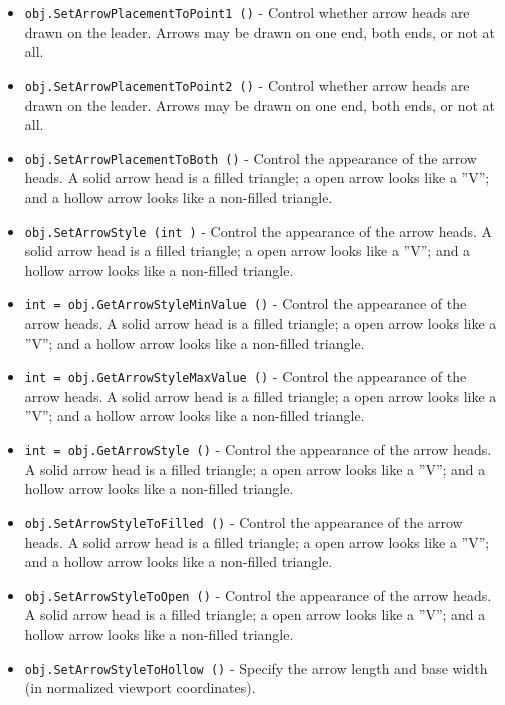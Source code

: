\begin{itemize}
\item  \verb|obj.SetArrowPlacementToPoint1 ()| -  Control whether arrow heads are drawn on the leader. Arrows may be
 drawn on one end, both ends, or not at all.

\item  \verb|obj.SetArrowPlacementToPoint2 ()| -  Control whether arrow heads are drawn on the leader. Arrows may be
 drawn on one end, both ends, or not at all.

\item  \verb|obj.SetArrowPlacementToBoth ()| -  Control the appearance of the arrow heads. A solid arrow head is a filled
 triangle; a open arrow looks like a ''V''; and a hollow arrow looks like a
 non-filled triangle.

\item  \verb|obj.SetArrowStyle (int )| -  Control the appearance of the arrow heads. A solid arrow head is a filled
 triangle; a open arrow looks like a ''V''; and a hollow arrow looks like a
 non-filled triangle.

\item  \verb|int = obj.GetArrowStyleMinValue ()| -  Control the appearance of the arrow heads. A solid arrow head is a filled
 triangle; a open arrow looks like a ''V''; and a hollow arrow looks like a
 non-filled triangle.

\item  \verb|int = obj.GetArrowStyleMaxValue ()| -  Control the appearance of the arrow heads. A solid arrow head is a filled
 triangle; a open arrow looks like a ''V''; and a hollow arrow looks like a
 non-filled triangle.

\item  \verb|int = obj.GetArrowStyle ()| -  Control the appearance of the arrow heads. A solid arrow head is a filled
 triangle; a open arrow looks like a ''V''; and a hollow arrow looks like a
 non-filled triangle.

\item  \verb|obj.SetArrowStyleToFilled ()| -  Control the appearance of the arrow heads. A solid arrow head is a filled
 triangle; a open arrow looks like a ''V''; and a hollow arrow looks like a
 non-filled triangle.

\item  \verb|obj.SetArrowStyleToOpen ()| -  Control the appearance of the arrow heads. A solid arrow head is a filled
 triangle; a open arrow looks like a ''V''; and a hollow arrow looks like a
 non-filled triangle.

\item  \verb|obj.SetArrowStyleToHollow ()| -  Specify the arrow length and base width (in normalized viewport
 coordinates).


\end{itemize}
